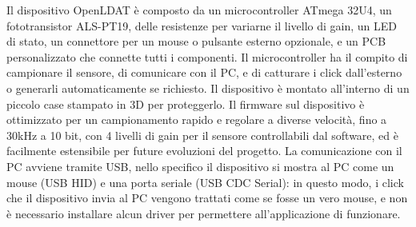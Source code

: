 \documentclass[a4paper]{article}
\begin{document}
Il dispositivo OpenLDAT è composto da un microcontroller ATmega 32U4, un fototransistor ALS-PT19, delle resistenze per variarne il livello di gain, un LED di stato, un connettore per un mouse o pulsante esterno opzionale, e un PCB personalizzato che connette tutti i componenti. Il microcontroller ha il compito di campionare il sensore, di comunicare con il PC, e di catturare i click dall'esterno o generarli automaticamente se richiesto. Il dispositivo è montato all'interno di un piccolo case stampato in 3D per proteggerlo. Il firmware sul dispositivo è ottimizzato per un campionamento rapido e regolare a diverse velocità, fino a 30kHz a 10 bit, con 4 livelli di gain per il sensore controllabili dal software, ed è facilmente estensibile per future evoluzioni del progetto. La comunicazione con il PC avviene tramite USB, nello specifico il dispositivo si mostra al PC come un mouse (USB HID) e una porta seriale (USB CDC Serial): in questo modo, i click che il dispositivo invia al PC vengono trattati come se fosse un vero mouse, e non è necessario installare alcun driver per permettere all'applicazione di funzionare.
\end{document}
